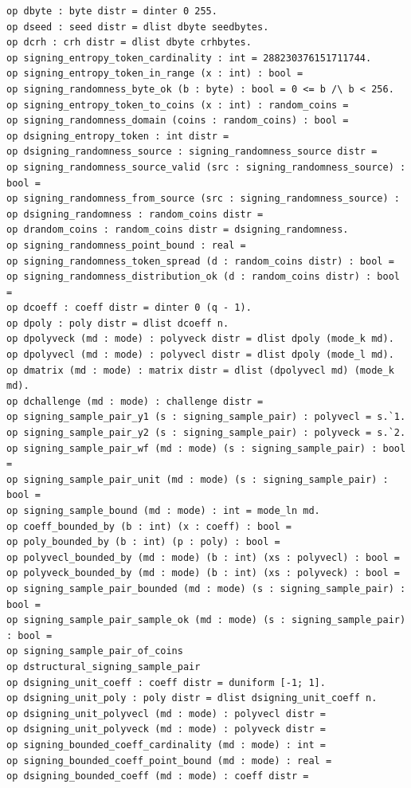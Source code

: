 \begin{lstlisting}[language=EasyCrypt,basicstyle=\ttfamily\tiny]
op dbyte : byte distr = dinter 0 255.
op dseed : seed distr = dlist dbyte seedbytes.
op dcrh : crh distr = dlist dbyte crhbytes.
op signing_entropy_token_cardinality : int = 288230376151711744.
op signing_entropy_token_in_range (x : int) : bool =
op signing_randomness_byte_ok (b : byte) : bool = 0 <= b /\ b < 256.
op signing_entropy_token_to_coins (x : int) : random_coins =
op signing_randomness_domain (coins : random_coins) : bool =
op dsigning_entropy_token : int distr =
op dsigning_randomness_source : signing_randomness_source distr =
op signing_randomness_source_valid (src : signing_randomness_source) : bool =
op signing_randomness_from_source (src : signing_randomness_source) :
op dsigning_randomness : random_coins distr =
op drandom_coins : random_coins distr = dsigning_randomness.
op signing_randomness_point_bound : real =
op signing_randomness_token_spread (d : random_coins distr) : bool =
op signing_randomness_distribution_ok (d : random_coins distr) : bool =
op dcoeff : coeff distr = dinter 0 (q - 1).
op dpoly : poly distr = dlist dcoeff n.
op dpolyveck (md : mode) : polyveck distr = dlist dpoly (mode_k md).
op dpolyvecl (md : mode) : polyvecl distr = dlist dpoly (mode_l md).
op dmatrix (md : mode) : matrix distr = dlist (dpolyvecl md) (mode_k md).
op dchallenge (md : mode) : challenge distr =
op signing_sample_pair_y1 (s : signing_sample_pair) : polyvecl = s.`1.
op signing_sample_pair_y2 (s : signing_sample_pair) : polyveck = s.`2.
op signing_sample_pair_wf (md : mode) (s : signing_sample_pair) : bool =
op signing_sample_pair_unit (md : mode) (s : signing_sample_pair) : bool =
op signing_sample_bound (md : mode) : int = mode_ln md.
op coeff_bounded_by (b : int) (x : coeff) : bool =
op poly_bounded_by (b : int) (p : poly) : bool =
op polyvecl_bounded_by (md : mode) (b : int) (xs : polyvecl) : bool =
op polyveck_bounded_by (md : mode) (b : int) (xs : polyveck) : bool =
op signing_sample_pair_bounded (md : mode) (s : signing_sample_pair) : bool =
op signing_sample_pair_sample_ok (md : mode) (s : signing_sample_pair) : bool =
op signing_sample_pair_of_coins
op dstructural_signing_sample_pair
op dsigning_unit_coeff : coeff distr = duniform [-1; 1].
op dsigning_unit_poly : poly distr = dlist dsigning_unit_coeff n.
op dsigning_unit_polyvecl (md : mode) : polyvecl distr =
op dsigning_unit_polyveck (md : mode) : polyveck distr =
op signing_bounded_coeff_cardinality (md : mode) : int =
op signing_bounded_coeff_point_bound (md : mode) : real =
op dsigning_bounded_coeff (md : mode) : coeff distr =

\end{lstlisting}
